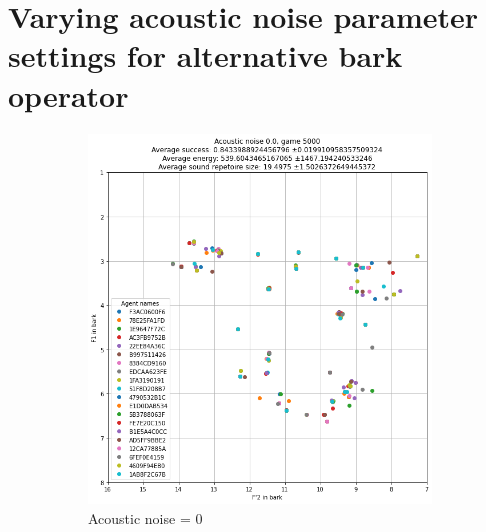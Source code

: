 \section*{Varying acoustic noise parameter settings for alternative bark operator}
\begin{figure}[ht]
    \centering
    \begin{subfigure}{.30\textwidth}
        \centering
        \includegraphics[width=\textwidth]{images/extra/bark_noise_1.png}
        \captionsetup{width=0.9\linewidth}
        \captionsetup{justification=centering}
        \caption{Acoustic noise = 0}
    \end{subfigure}
    \hspace{0.5cm}
    \begin{subfigure}{.30\textwidth}
        \centering

\end{subfigure}
\end{figure}
